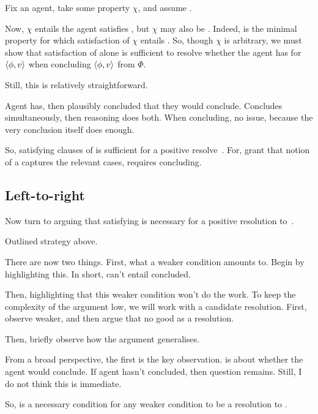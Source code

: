 \begin{note}
  Fix an agent, take some property \(\chi\), and assume .

  Now, \(\chi\) entails the agent satisfies \iZs{}, but \(\chi\) may also be \Zs{}.
  Indeed, \Zs{} is the minimal property for which satisfaction of \(\chi\) entails \Zs{}.
  So, though \(\chi\) is arbitrary, we must show that satisfaction of \Zs{} alone is sufficient to resolve whether the agent has \zs{} for \(\langle \phi, v \rangle\) when concluding \(\langle \phi, v \rangle\) from \(\Phi\).

  Still, this is relatively straightforward.

  Agent has, then plausibly concluded that they would conclude.
  Concludes simultaneously, then reasoning does both.
  When concluding, no issue, because the very conclusion itself does enough.


  So, satisfying clauses of \iZs{} is sufficient for a positive resolve~\qzs{}.
  For, grant that notion of a  captures the relevant cases, \iCS{} requires concluding.
\end{note}

\subsection{Left-to-right}

\begin{note}
  Now turn to arguing that satisfying \iCS{} is necessary for a positive resolution to~\qzs{}.

  Outlined strategy above.

  There are now two things.
  First, what a weaker condition amounts to.
  Begin by highlighting this.
  In short, can't entail concluded.

  Then, highlighting that this weaker condition won't do the work.
  To keep the complexity of the argument low, we will work with a candidate resolution.
  First, observe weaker, and then argue that no good as a resolution.

  Then, briefly observe how the argument generalises.

  From a broad perspective, the first is the key observation.
  \qzs{} is about whether the agent would conclude.
  If agent hasn't concluded, then question remains.
  Still, I do not think this is immediate.

  So, \iCS{} is a necessary condition for any weaker condition to be a resolution to \qzs{}.
\end{note}

